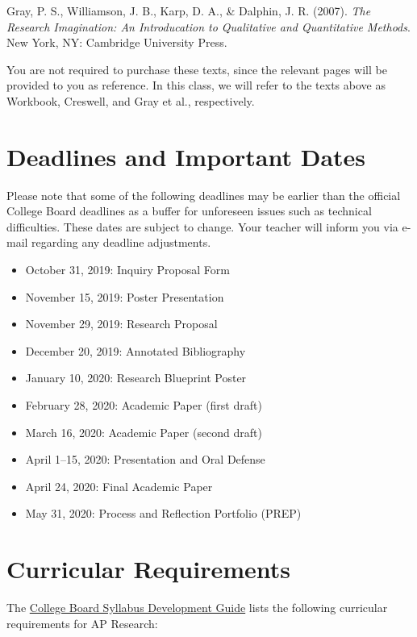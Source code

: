 \documentclass[11pt,]{article}
\providecommand{\tightlist}{%
  \setlength{\itemsep}{0pt}\setlength{\parskip}{0pt}}
\begin{document}
Gray, P. S., Williamson, J. B., Karp, D. A., \& Dalphin, J. R.
(2007). \emph{The Research Imagination: An Introducation to Qualitative
and Quantitative Methods}. New York, NY: Cambridge University
Press.

You are not required to purchase these texts, since the relevant pages will be provided to you as reference. In this class, we will refer to the texts above as Workbook, Creswell, and Gray et al., respectively.

\hypertarget{deadlines-and-important-dates}{%
\section{Deadlines and Important Dates}\label{deadlines-and-important-dates}}

Please note that some of the following deadlines may be earlier than the official College Board deadlines as a buffer for unforeseen issues such as technical difficulties. These dates are subject to change. Your teacher will inform you via e-mail regarding any deadline adjustments.

\begin{itemize}
\tightlist
\item
  October 31, 2019: Inquiry Proposal Form
\item
  November 15, 2019: Poster Presentation
\item
  November 29, 2019: Research Proposal
\item
  December 20, 2019: Annotated Bibliography
\item
  January 10, 2020: Research Blueprint Poster
\item
  February 28, 2020: Academic Paper (first draft)
\item
  March 16, 2020: Academic Paper (second draft)
\item
  April 1--15, 2020: Presentation and Oral Defense
\item
  April 24, 2020: Final Academic Paper
\item
  May 31, 2020: Process and Reflection Portfolio (PREP)
\end{itemize}

\hypertarget{curricular-requirements}{%
\section{Curricular Requirements}\label{curricular-requirements}}

The \href{https://secure-media.collegeboard.org/digitalServices/pdf/ap/ap-course-audit/ap-research-syllabus-development-guide.pdf}{College Board Syllabus Development Guide} lists the following curricular requirements for AP Research:
\end{document}
